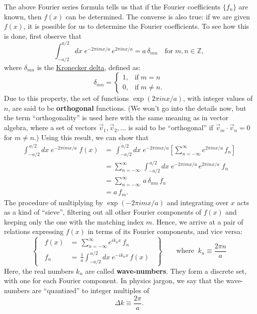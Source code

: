 \documentclass[10pt,a4paper]{article}
\begin{document}
The above Fourier series formula tells us that if the Fourier
coefficients $\{f_n\}$ are known, then $f(x)$ can be determined. The
converse is also true: if we are given $f(x)$, it is possible for us
to determine the Fourier coefficients. To see how this is done, first
observe that
\begin{equation}
  \int_{-a/2}^{a/2} dx \; e^{-2\pi i m x/a}\, e^{2\pi i n x/a}
  = a\, \delta_{mn}\quad \mathrm{for}\;m, n \in \mathbb{Z},
\end{equation}
where $\delta_{mn}$ is the
\href{http://en.wikipedia.org/wiki/Kronecker_delta}{Kronecker delta},
defined as:
\begin{equation}
  \delta_{mn} = \left\{\begin{array}{ll}1, & \textrm{if}\; m = n
  \\ 0, & \mathrm{if}\;m\ne n.\end{array}\right.
\end{equation}
Due to this property, the set of functions $\exp(2\pi i n x / a)$,
with integer values of $n$, are said to be \textbf{orthogonal}
functions. (We won't go into the details now, but the term
``orthogonality'' is used here with the same meaning as in vector
algebra, where a set of vectors $\vec{v}_1, \vec{v}_2, \dots$ is said
to be ``orthogonal'' if $\vec{v}_m \cdot \vec{v}_n = 0$ for $m\ne n$.)
Using this result, we can show that
\begin{align}
  \int_{-a/2}^{\,a/2} dx\; e^{-2\pi i m x/a} \;f(x)
&= \, \int_{-a/2}^{\,a/2} dx\; e^{-2\pi i m x/a} \left[\sum_{n=-\infty}^\infty e^{2\pi i n x/a}\, f_n\right] \\
&= \sum_{n=-\infty}^\infty \, \int_{-a/2}^{\,a/2} dx\; e^{-2\pi i m x/a}  \, e^{2\pi i n x/a} \;f_n \\
&= \sum_{n=-\infty}^\infty \, a\, \delta_{mn} \, f_n \\
&= a \,f_m.
\end{align}
The procedure of multiplying by $\exp(-2\pi i m x/a)$ and integrating
over $x$ acts as a kind of ``sieve'', filtering out all other Fourier
components of $f(x)$ and keeping only the one with the matching index
$m$. Hence, we arrive at a pair of relations expressing $f(x)$ in
terms of its Fourier components, and vice versa:
\begin{equation}
  \left\{\;\;\begin{array}{rl}f(x)
  &= \displaystyle \, \sum_{n=-\infty}^\infty e^{i k_n x}\, f_n
  \\ f_n &= \displaystyle\,\frac{1}{a} \int_{-a/2}^{\,a/2} dx\; e^{-i k_n x}\, f(x)
  \end{array}\;\;\right\} \quad\quad\mathrm{where}\;\; k_n \equiv \frac{2\pi n}{a}
\end{equation}
Here, the real numbers $k_n$ are called \textbf{wave-numbers}. They
form a discrete set, with one for each Fourier component. In physics
jargon, we say that the wave-numbers are ``quantized'' to integer
multiples of
\begin{equation}
  \Delta k \equiv \frac{2\pi}{a}.
\end{equation}
\end{document}
